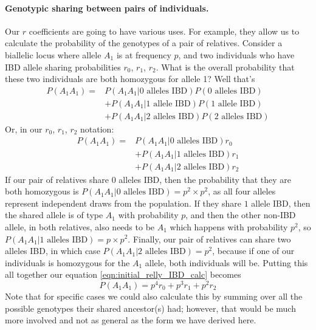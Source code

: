 {{\paragraph{Genotypic sharing between pairs of individuals.}
Our $r$ coefficients are going to have various uses. For example, they allow us
to calculate the probability of the genotypes of a pair of
relatives. Consider a biallelic locus where allele $A_1$ is
at frequency $p$, and two individuals who have IBD allele sharing
probabilities $r_0$, $r_1$, $r_2$. What is the overall probability that these
two individuals are both homozygous for allele 1? Well that's
\begin{align}
  P(A_1 A_1) = & P(A_1 A_1 | \text{0 alleles IBD}) P(\text{0 alleles IBD})  \nonumber\\
  & + P(A_1 A_1 | \text{1 allele IBD}) P(\text{1 allele IBD})  \nonumber\\
  &+ P(A_1 A_1 | \text{2 alleles IBD}) P(\text{2 alleles IBD})
\end{align}
Or, in our $r_0$, $r_1$, $r_2$ notation:
\begin{align}
  P(A_1 A_1) = & P(A_1 A_1 | \text{0 alleles IBD}) r_0  \nonumber\\
  & + P(A_1 A_1 |
  \text{1 alleles IBD}) r_1  \nonumber\\
  & + P(A_1 A_1 | \text{2 alleles IBD}) r_2 \label{eqn:initial_relly_IBD_calc}
\end{align}
If our pair of relatives share $0$ alleles IBD, then the probability that
they are both homozygous is $P(A_1 A_1 |
\text{0 alleles IBD}) =p^2 \times p^2$, as all four alleles
represent independent draws from the population. If they share $1$
allele IBD, then the shared allele is of type $A_1$ with probability $p$, and then
the other non-IBD allele, in both relatives, also needs
to be $A_1$ which happens with probability $p^2$, so $P(A_1 A_1 |
\text{1 alleles IBD})=p \times p^2$. Finally, our pair of relatives can
share two alleles IBD, in which case $P(A_1 A_1 | \text{2 alleles IBD})
= p^2$, because if one of our individuals is homozygous for the $A_1$ allele,
both individuals will be. Putting this all together our equation
\eqref{eqn:initial_relly_IBD_calc} becomes
\begin{equation}
P(A_1 A_1) = p^4 r_0 + p^3 r_1 + p^2 r_2 \label{eqn:IBD_relly_calc}
\end{equation}
Note that for specific cases we could also calculate this by summing over all the
possible genotypes their shared ancestor(s) had; however, that would be much more
involved and not as general as the form we have derived here.

}}
